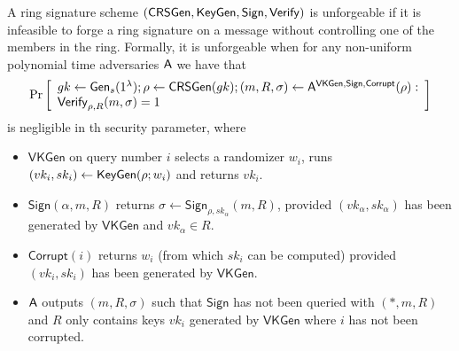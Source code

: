 \begin{definition}
A ring signature scheme $(\mathsf{CRSGen}, \mathsf{KeyGen}, \mathsf{Sign}, \mathsf{Verify})$
is unforgeable if it is infeasible to forge a ring
signature on a message without controlling one of the members in the ring. Formally, it
is unforgeable when for any non-uniform polynomial
time adversaries $\mathsf{A}$ we have that
$$
\Pr\left[\begin{array}{l}
gk\gets\mathsf{Gen}_s(1^\lambda);\rho\gets\mathsf{CRSGen}(gk);(m,R,\sigma)\gets\mathsf{A}^{\mathsf{VKGen},\mathsf{Sign},\mathsf{Corrupt}}(\rho):\\
\mathsf{Verify}_{\rho,R}(m,\sigma)=1
\end{array}\right]
$$
is negligible in th security parameter, where

\begin{itemize}
\item $\mathsf{VKGen}$ on query number $i$ selects a randomizer $w_i$, runs $(vk_i,sk_i) \gets \mathsf{KeyGen}(\rho; w_i)$
and returns $vk_i$.
\item $\mathsf{Sign}(\alpha, m, R)$ returns $\sigma \gets \mathsf{Sign}_{\rho,sk_\alpha}(m, R)$, provided $(vk_\alpha, sk_\alpha)$ has been generated
by $\mathsf{VKGen}$ and $vk_\alpha\in R$.
\item $\mathsf{Corrupt}(i)$ returns $w_i$ (from which $sk_i$ can be computed) provided $(vk_i, sk_i)$ has
been generated by $\mathsf{VKGen}$.
\item $\mathsf{A}$ outputs $(m, R, \sigma)$ such that $\mathsf{Sign}$ has not been queried with $(*, m, R)$ and $R$
only contains keys $vk_i$ generated by $\mathsf{VKGen}$ where $i$ has not been corrupted.
\end{itemize}
\end{definition}

